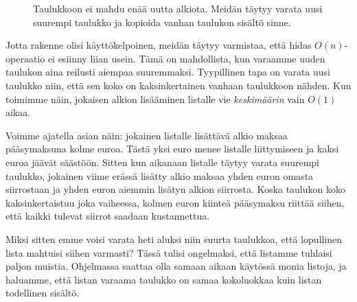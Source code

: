 \begin{figure}
\center
{}
\caption{Taulukkoon ei mahdu enää uutta alkiota. Meidän täytyy varata uusi suurempi taulukko
ja kopioida vanhan taulukon sisältö sinne.}
\label{fig:lisuus}
\end{figure}

Jotta rakenne olisi käyttökelpoinen, meidän täytyy varmistaa,
että hidas $O(n)$-operaatio ei esiinny liian usein.
Tämä on mahdollista, kun varaamme uuden taulukon aina reilusti aiempaa suuremmaksi.
Tyypillinen tapa on varata uusi taulukko niin,
että sen koko on kaksinkertainen vanhaan taulukkoon nähden.
Kun toimimme näin, jokaisen alkion lisääminen listalle vie
\emph{keskimäärin} vain $O(1)$ aikaa.

Voimme ajatella asian näin: jokainen listalle lisättävä alkio
maksaa pääsy\-maksuna kolme euroa.
Tästä yksi euro menee listalle liittymiseen ja kaksi euroa jäävät säästöön.
Sitten kun aikanaan listalle täytyy varata suurempi taulukko,
jokainen viime erässä lisätty alkio maksaa yhden euron omasta siirrostaan
ja yhden euron aiemmin lisätyn alkion siirrosta.
Koska taulukon koko kaksinkertaistuu joka vaiheessa,
kolmen euron kiinteä pääsymaksu riittää siihen, että kaikki tulevat
siirrot saadaan kustannettua.

Miksi sitten emme voisi varata heti aluksi niin suurta taulukkoa,
että lopullinen lista mahtuisi siihen varmasti?
Tässä tulisi ongelmaksi, että listamme tuhlaisi paljon muistia.
Ohjelmassa saattaa olla samaan aikaan käytössä monia listoja,
ja haluamme, että listan varaama taulukko on samaa kokoluokkaa
kuin listan todellinen sisältö.


